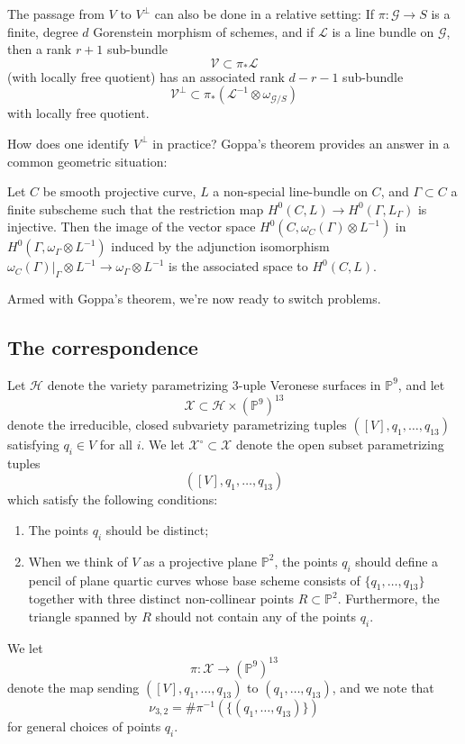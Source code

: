 \documentclass{article}
\renewcommand{\P}{\mathbb{P}}
\begin{document}
\begin{remark}
The passage from $V$ to $V^{\perp}$ can also be done
in a relative setting: If $\pi : \mathcal{G} \to S$ is a finite, degree $d$
Gorenstein morphism of schemes, and if $\mathcal{L}$ is a line bundle
on $\mathcal{G}$, then a rank $r+1$ sub-bundle
\[\mathcal{V} \subset \pi_{*}\mathcal{L}\] (with locally free
quotient) has an associated rank $d-r-1$
sub-bundle
\[\mathcal{V}^{\perp} \subset \pi_{*} \left(\mathcal{L}^{-1} \otimes
    \omega_{\mathcal{G}/S}\right)\] with locally free quotient.
\end{remark}

How does one identify $V^{\perp}$ in practice?
Goppa's theorem provides an answer 
in a common geometric situation:

\begin{lemma}[Goppa]
  \label{lemma:goppa} Let $C$ be smooth projective curve, $L$ a
  non-special line-bundle on $C$, and $\Gamma \subset C$ a finite
  subscheme such that the restriction map
  $H^{0}(C,L) \to H^{0}(\Gamma, L_{\Gamma})$ is injective.  Then the
  image of the vector space
  $H^{0}(C, \omega_{C}(\Gamma) \otimes L^{-1})$ in
  $H^{0}(\Gamma, \omega_{\Gamma} \otimes L^{-1})$ induced by the
  adjunction isomorphism
  $\omega_{C}(\Gamma)|_{\Gamma} \otimes L^{-1} \to \omega_{\Gamma} \otimes L^{-1}$ is the associated
  space to $H^{0}(C,L)$.
\end{lemma}

Armed with Goppa's theorem, we're now ready to switch problems.


\subsection{The correspondence}

Let $\mathcal{H}$ denote the variety parametrizing $3$-uple Veronese surfaces in $\P^{9}$, and let $$\mathcal{X} \subset \mathcal{H} \times (\P^{9})^{13}$$ denote the irreducible, closed subvariety parametrizing tuples $([V],q_1,\dots, q_{13})$ satisfying $q_{i} \in V$ for all $i$.  We let $\mathcal{X}^{\circ} \subset \mathcal{X}$ denote the open subset  parametrizing tuples $$\left([V], q_1, \dots, q_{13}\right)$$ which satisfy the following conditions: 

\begin{enumerate}
    \item The points $q_{i}$ should be distinct;
    \item When we think of $V$ as a projective plane $\P^{2}$, the points $q_{i}$ should define a pencil of plane quartic curves whose base scheme consists of $\{q_1, \dots, q_{13}\}$ together with three distinct non-collinear points $R \subset \P^{2}$. Furthermore, the triangle spanned by $R$  should not contain any of the points $q_{i}$. 
\end{enumerate}
We let $$\pi: \mathcal{X} \to (\P^{9})^{13}$$ denote the map sending $([V],q_1, \dots, q_{13})$ to $(q_{1}, \dots, q_{13})$, and we note that $$\nu_{3,2} = \# \pi^{-1}(\{(q_1, \dots, q_{13})\})$$ for general choices of points $q_{i}$. 
\end{document}
